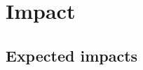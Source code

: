 \documentclass[12pt, a4paper]{article} %
\begin{document}
\section{Impact}

\subsection{Expected impacts}

\end{document}
